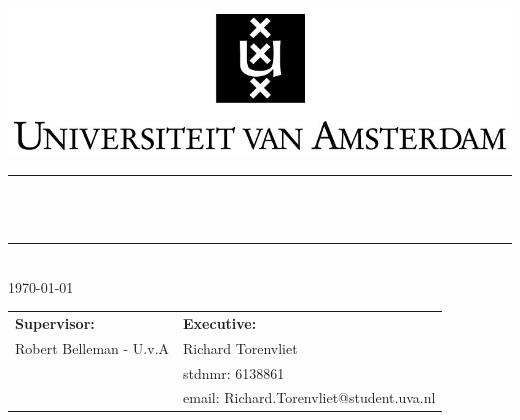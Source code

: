 \newcommand{\HRule}{\rule{\linewidth}{0.5mm}}

\begin{titlepage}
\begin{center}
\includegraphics[width=1\textwidth]{uva}\\[0.5cm]

\HRule \\[0.2cm]
{ \huge \LARGE \textbf{\projectName}\\[0.1cm]
 \vspace{0.2cm}}
\HRule \\[0.4cm]
\Large \today

\vfill

\begin{tabular}{ll}
	\textbf{Supervisor:}  & 	\textbf{Executive:}  \\
	Robert Belleman  - U.v.A &  Richard Torenvliet \\
	& stdnmr: 6138861 \\ 
	& email: Richard.Torenvliet@student.uva.nl
\end{tabular}
\end{center}
\end{titlepage}